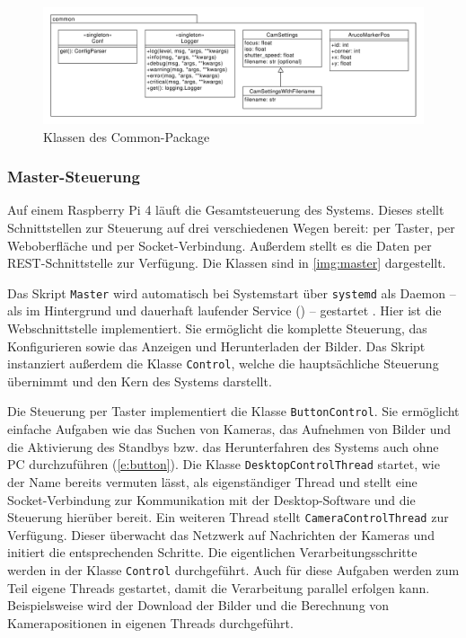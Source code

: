 \documentclass[./00PhotoBox.tex]{subfiles}
\begin{document}
\begin{figure}
  \centering
  \includegraphics[width=1\textwidth]{./img/uml/uml_common_classdiagramm.pdf}
  \caption{Klassen des Common-Package} %
  \label{img:uml_common} %
\end{figure}


\subsubsection{Master-Steuerung}

Auf einem Raspberry Pi 4 läuft die Gesamt\-steuerung des Systems. Dieses stellt Schnitt\-stellen zur Steuerung auf drei verschiedenen Wegen bereit: per Taster, per Weboberfläche und per Socket-Verbindung. Außerdem stellt es die Daten per REST-Schnittstelle  zur Verfügung. Die Klassen sind in \autoref{img:master} dargestellt.

Das Skript \texttt{Master} wird automatisch bei Systemstart über \texttt{systemd} als Daemon -- als im Hintergrund und dauerhaft laufender Service (\citep[S. 369]{negus2020linux}) -- gestartet . Hier ist die Webschnittstelle implementiert. Sie ermöglicht die komplette Steuerung, das Konfigurieren sowie das Anzeigen und Herunterladen der Bilder. Das Skript instanziert außerdem die Klasse \texttt{Control}, welche die hauptsächliche Steuerung übernimmt und den Kern des Systems darstellt.

Die Steuerung per Taster implementiert die Klasse \texttt{ButtonControl}. Sie ermöglicht einfache Aufgaben wie das Suchen von Kameras, das Aufnehmen von Bilder und die Aktivierung des Standbys bzw. das Herunterfahren des Systems auch ohne PC durchzuführen (\autoref{e:button}). Die Klasse \texttt{DesktopControlThread} startet, wie der Name bereits vermuten lässt, als eigenständiger Thread und stellt eine Socket-Verbindung zur Kommunikation mit der Desktop-Software und die Steuerung hierüber bereit. Ein weiteren Thread stellt \texttt{CameraControlThread} zur Verfügung. Dieser überwacht das Netzwerk auf Nachrichten der Kameras und initiert die entsprechenden Schritte. Die eigentlichen Verarbeitungsschritte werden in der Klasse \texttt{Control} durchgeführt. Auch für diese Aufgaben werden zum Teil eigene Threads gestartet, damit die Verarbeitung parallel erfolgen kann. Beispielsweise wird der Download der Bilder und die Berechnung von Kamerapositionen in eigenen Threads durchgeführt.
\end{document}
